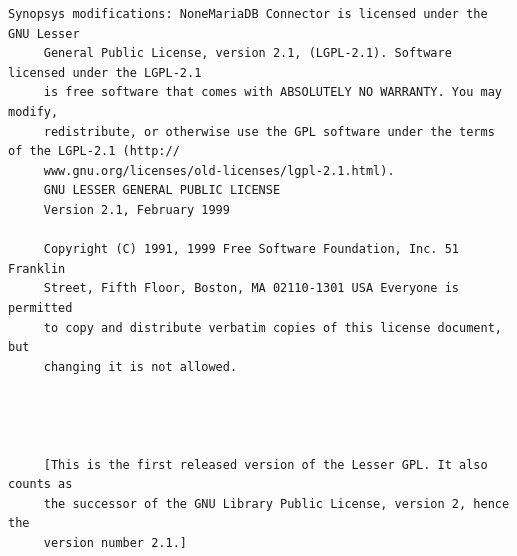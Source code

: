 \begin{lstlisting}[basicstyle=\ttfamily\footnotesize,breaklines=true]
     Synopsys modifications: NoneMariaDB Connector is licensed under the GNU Lesser
     General Public License, version 2.1, (LGPL-2.1). Software licensed under the LGPL-2.1
     is free software that comes with ABSOLUTELY NO WARRANTY. You may modify,
     redistribute, or otherwise use the GPL software under the terms of the LGPL-2.1 (http://
     www.gnu.org/licenses/old-licenses/lgpl-2.1.html).
     GNU LESSER GENERAL PUBLIC LICENSE
     Version 2.1, February 1999

     Copyright (C) 1991, 1999 Free Software Foundation, Inc. 51 Franklin
     Street, Fifth Floor, Boston, MA 02110-1301 USA Everyone is permitted
     to copy and distribute verbatim copies of this license document, but
     changing it is not allowed.




     [This is the first released version of the Lesser GPL. It also counts as
     the successor of the GNU Library Public License, version 2, hence the
     version number 2.1.]


\end{lstlisting}
